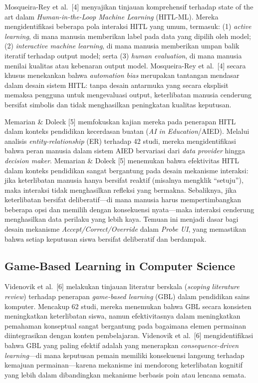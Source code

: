 Mosqueira-Rey et al.\ [4] menyajikan tinjauan komprehensif terhadap state of the art dalam \textit{Human-in-the-Loop Machine Learning} (HITL-ML). Mereka mengidentifikasi beberapa pola interaksi HITL yang umum, termasuk: (1) \textit{active learning}, di mana manusia memberikan label pada data yang dipilih oleh model; (2) \textit{interactive machine learning}, di mana manusia memberikan umpan balik iteratif terhadap output model; serta (3) \textit{human evaluation}, di mana manusia menilai kualitas atau kebenaran output model. Mosqueira-Rey et al.\ [4] secara khusus menekankan bahwa \textit{automation bias} merupakan tantangan mendasar dalam desain sistem HITL: tanpa desain antarmuka yang secara eksplisit memaksa pengguna untuk mengevaluasi output, keterlibatan manusia cenderung bersifat simbolis dan tidak menghasilkan peningkatan kualitas keputusan.

Memarian \& Doleck [5] memfokuskan kajian mereka pada penerapan HITL dalam konteks pendidikan kecerdasan buatan (\textit{AI in Education}/AIED). Melalui analisis \textit{entity-relationship} (ER) terhadap 42 studi, mereka mengidentifikasi bahwa peran manusia dalam sistem AIED bervariasi dari \textit{data provider} hingga \textit{decision maker}. Memarian \& Doleck [5] menemukan bahwa efektivitas HITL dalam konteks pendidikan sangat bergantung pada desain mekanisme interaksi: jika keterlibatan manusia hanya bersifat reaktif (misalnya mengklik ``setuju''), maka interaksi tidak menghasilkan refleksi yang bermakna. Sebaliknya, jika keterlibatan bersifat deliberatif---di mana manusia harus mempertimbangkan beberapa opsi dan memilih dengan konsekuensi nyata---maka interaksi cenderung menghasilkan data perilaku yang lebih kaya. Temuan ini menjadi dasar bagi desain mekanisme \textit{Accept/Correct/Override} dalam \textit{Probe UI}, yang memastikan bahwa setiap keputusan siswa bersifat deliberatif dan berdampak.

\subsection{Game-Based Learning in Computer Science}
\label{subsec:penelitian-gbl-cs}

Videnovik et al.\ [6] melakukan tinjauan literatur berskala (\textit{scoping literature review}) terhadap penerapan \textit{game-based learning} (GBL) dalam pendidikan sains komputer. Mencakup 62 studi, mereka menemukan bahwa GBL secara konsisten meningkatkan keterlibatan siswa, namun efektivitasnya dalam meningkatkan pemahaman konseptual sangat bergantung pada bagaimana elemen permainan diintegrasikan dengan konten pembelajaran. Videnovik et al.\ [6] mengidentifikasi bahwa GBL yang paling efektif adalah yang menerapkan \textit{consequence-driven learning}---di mana keputusan pemain memiliki konsekuensi langsung terhadap kemajuan permainan---karena mekanisme ini mendorong keterlibatan kognitif yang lebih dalam dibandingkan mekanisme berbasis poin atau lencana semata.

